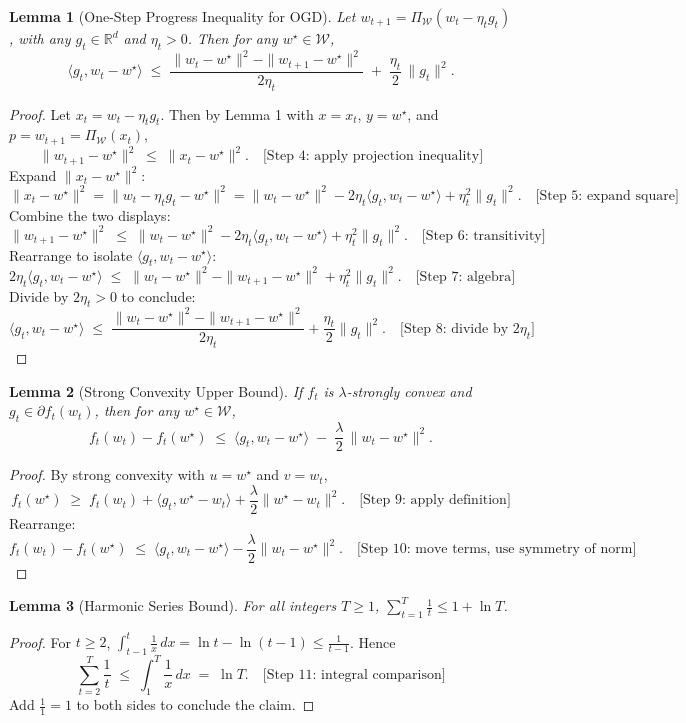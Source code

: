 \documentclass[12pt]{article}
\newtheorem{lemma}{Lemma}
\begin{document}
\begin{lemma}[One-Step Progress Inequality for OGD]\label{lem:one-step}
Let $w_{t+1} = \Pi_{\mathcal{W}}(w_t - \eta_t g_t)$, with any $g_t\in\mathbb{R}^d$ and $\eta_t>0$. Then for any $w^\star\in \mathcal{W}$,
\[
\langle g_t, w_t - w^\star\rangle \;\le\; \frac{\|w_t - w^\star\|^2 - \|w_{t+1}-w^\star\|^2}{2\eta_t} \;+\; \frac{\eta_t}{2}\,\|g_t\|^2.
\]
\end{lemma}
\begin{proof}
Let $x_t = w_t - \eta_t g_t$. Then by Lemma 1 with $x=x_t$, $y=w^\star$, and $p=w_{t+1}=\Pi_{\mathcal{W}}(x_t)$,
\[
\|w_{t+1}-w^\star\|^2 \;\le\; \|x_t - w^\star\|^2. \quad \text{[Step 4: apply projection inequality]}
\]
Expand $\|x_t - w^\star\|^2$:
\[
\|x_t - w^\star\|^2 = \|w_t - \eta_t g_t - w^\star\|^2 = \|w_t - w^\star\|^2 - 2\eta_t \langle g_t, w_t - w^\star\rangle + \eta_t^2 \|g_t\|^2. \quad \text{[Step 5: expand square]}
\]
Combine the two displays:
\[
\|w_{t+1}-w^\star\|^2 \;\le\; \|w_t - w^\star\|^2 - 2\eta_t \langle g_t, w_t - w^\star\rangle + \eta_t^2 \|g_t\|^2. \quad \text{[Step 6: transitivity]}
\]
Rearrange to isolate $\langle g_t, w_t - w^\star\rangle$:
\[
2\eta_t \langle g_t, w_t - w^\star\rangle \;\le\; \|w_t - w^\star\|^2 - \|w_{t+1}-w^\star\|^2 + \eta_t^2 \|g_t\|^2. \quad \text{[Step 7: algebra]}
\]
Divide by $2\eta_t>0$ to conclude:
\[
\langle g_t, w_t - w^\star\rangle \;\le\; \frac{\|w_t - w^\star\|^2 - \|w_{t+1}-w^\star\|^2}{2\eta_t} + \frac{\eta_t}{2}\|g_t\|^2. \quad \text{[Step 8: divide by }2\eta_t]
\]
\end{proof}

\begin{lemma}[Strong Convexity Upper Bound]\label{lem:sc}
If $f_t$ is $\lambda$-strongly convex and $g_t\in \partial f_t(w_t)$, then for any $w^\star\in \mathcal{W}$,
\[
f_t(w_t) - f_t(w^\star) \;\le\; \langle g_t, w_t - w^\star\rangle \;-\; \frac{\lambda}{2}\,\|w_t - w^\star\|^2.
\]
\end{lemma}
\begin{proof}
By strong convexity with $u=w^\star$ and $v=w_t$,
\[
f_t(w^\star) \;\ge\; f_t(w_t) + \langle g_t, w^\star - w_t\rangle + \frac{\lambda}{2}\|w^\star - w_t\|^2. \quad \text{[Step 9: apply definition]}
\]
Rearrange:
\[
f_t(w_t) - f_t(w^\star) \;\le\; \langle g_t, w_t - w^\star\rangle - \frac{\lambda}{2}\|w_t - w^\star\|^2. \quad \text{[Step 10: move terms, use symmetry of norm]}
\]
\end{proof}

\begin{lemma}[Harmonic Series Bound]\label{lem:harm}
For all integers $T\ge 1$, $\sum_{t=1}^T \frac{1}{t} \le 1 + \ln T$.
\end{lemma}
\begin{proof}
For $t\ge 2$, $\int_{t-1}^{t}\frac{1}{x}\,dx = \ln t - \ln(t-1) \le \frac{1}{t-1}$. Hence
\[
\sum_{t=2}^T \frac{1}{t} \;\le\; \int_{1}^{T} \frac{1}{x}\,dx \;=\; \ln T. \quad \text{[Step 11: integral comparison]}
\]
Add $\frac{1}{1}=1$ to both sides to conclude the claim. \quad \text{[Step 12: add $t=1$ term]}
\end{proof}
\end{document}
